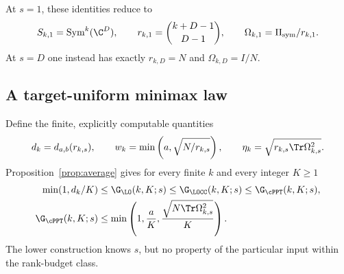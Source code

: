 At $s=1$, these identities reduce to
\[
 S_{k,1}=\operatorname{Sym}^k(\C^D),\qquad
 r_{k,1}=\binom{k+D-1}{D-1},\qquad
 \Omega_{k,1}=\Pi_{\rm sym}/r_{k,1}.
\]
At $s=D$ one instead has exactly $r_{k,D}=N$ and $\Omega_{k,D}=I/N$.

\subsection{A target-uniform minimax law}
Define the finite, explicitly computable quantities
\begin{equation}\label{eq:dw}
 d_k=d_{a,b}(r_{k,s}),\qquad
 w_k=\min\left(a,\sqrt{N/r_{k,s}}\right),\qquad
 \eta_k=\sqrt{r_{k,s}\Tr\Omega_{k,s}^2}.
\end{equation}
Proposition~\ref{prop:average} gives for every finite $k$ and every integer $K\ge1$
\begin{equation}\label{eq:minimax-finite}
 \begin{aligned}
 \min(1,d_k/K)&\le\G_{\LO}(k,K;s)\le\G_{\LOCC}(k,K;s)
 \le\G_{\cPPT}(k,K;s),\\
 \G_{\cPPT}(k,K;s)&\le\min\left(1,\frac aK,\frac{\sqrt{N\Tr\Omega_{k,s}^2}}K\right).
 \end{aligned}
\end{equation}
The lower construction knows $s$, but no property of the particular input within the rank-budget class.


